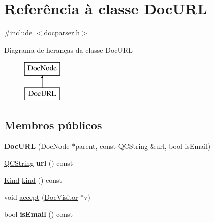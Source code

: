 \hypertarget{class_doc_u_r_l}{\section{Referência à classe Doc\-U\-R\-L}
\label{class_doc_u_r_l}
}


{\ttfamily \#include $<$docparser.\-h$>$}

Diagrama de heranças da classe Doc\-U\-R\-L\begin{figure}[H]
\begin{center}
\leavevmode
\includegraphics[height=2.000000cm]{class_doc_u_r_l}
\end{center}
\end{figure}
\subsection*{Membros públicos}
\begin{DoxyCompactItemize}
\item 
\hypertarget{class_doc_u_r_l_ac4b0cd5c2109c4563e7c6e7387486626}{{\bfseries Doc\-U\-R\-L} (\hyperlink{class_doc_node}{Doc\-Node} $\ast$\hyperlink{class_doc_node_abd7f070d6b0a38b4da71c2806578d19d}{parent}, const \hyperlink{class_q_c_string}{Q\-C\-String} \&url, bool is\-Email)}\label{class_doc_u_r_l_ac4b0cd5c2109c4563e7c6e7387486626}

\item 
\hypertarget{class_doc_u_r_l_a33ca03a1959afc82bd99d7c515a9f599}{\hyperlink{class_q_c_string}{Q\-C\-String} {\bfseries url} () const }\label{class_doc_u_r_l_a33ca03a1959afc82bd99d7c515a9f599}

\item 
\hyperlink{class_doc_node_aa10c9e8951b8ccf714a59ec321bdac5b}{Kind} \hyperlink{class_doc_u_r_l_aa9d037bed9f9a083d0cd01485637d843}{kind} () const 
\item 
void \hyperlink{class_doc_u_r_l_a7ba716e854ae2f8f87a4eb2140e302b6}{accept} (\hyperlink{class_doc_visitor}{Doc\-Visitor} $\ast$v)
\item 
\hypertarget{class_doc_u_r_l_ac8d879b64a37a6ec7371eb7e7e05202d}{bool {\bfseries is\-Email} () const }\label{class_doc_u_r_l_ac8d879b64a37a6ec7371eb7e7e05202d}

\end{DoxyCompactItemize}
